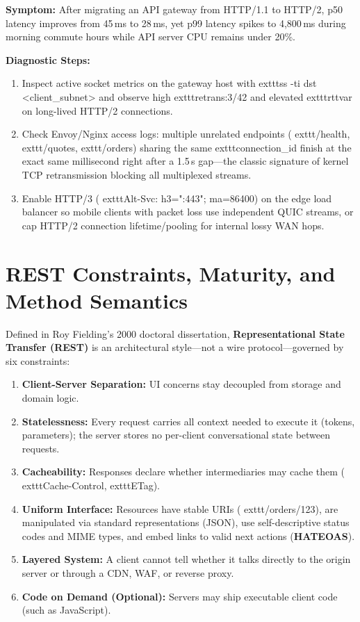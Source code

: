 \begin{realworldbox}
\textbf{Symptom:} After migrating an API gateway from HTTP/1.1 to HTTP/2, p50 latency improves from 45\,ms to 28\,ms, yet p99 latency spikes to 4,800\,ms during morning commute hours while API server CPU remains under 20\%.

\textbf{Diagnostic Steps:}
\begin{enumerate}[leftmargin=15pt,itemsep=2pt]
  \item Inspect active socket metrics on the gateway host with 	exttt{ss -ti dst <client\_subnet>} and observe high 	exttt{retrans:3/42} and elevated 	exttt{rttvar} on long-lived HTTP/2 connections.
  \item Check Envoy/Nginx access logs: multiple unrelated endpoints (	exttt{/health}, 	exttt{/quotes}, 	exttt{/orders}) sharing the same 	exttt{connection\_id} finish at the exact same millisecond right after a 1.5\,s gap---the classic signature of kernel TCP retransmission blocking all multiplexed streams.
  \item Enable HTTP/3 (	exttt{Alt-Svc: h3=":443"; ma=86400}) on the edge load balancer so mobile clients with packet loss use independent QUIC streams, or cap HTTP/2 connection lifetime/pooling for internal lossy WAN hops.
\end{enumerate}
\end{realworldbox}

\section{REST Constraints, Maturity, and Method Semantics}

Defined in Roy Fielding's 2000 doctoral dissertation, \textbf{Representational State Transfer (REST)} is an architectural style---not a wire protocol---governed by six constraints:
\begin{enumerate}[leftmargin=15pt]
  \item \textbf{Client-Server Separation:} UI concerns stay decoupled from storage and domain logic.
  \item \textbf{Statelessness:} Every request carries all context needed to execute it (tokens, parameters); the server stores no per-client conversational state between requests.
  \item \textbf{Cacheability:} Responses declare whether intermediaries may cache them (	exttt{Cache-Control}, 	exttt{ETag}).
  \item \textbf{Uniform Interface:} Resources have stable URIs (	exttt{/orders/123}), are manipulated via standard representations (JSON), use self-descriptive status codes and MIME types, and embed links to valid next actions (\textbf{HATEOAS}).
  \item \textbf{Layered System:} A client cannot tell whether it talks directly to the origin server or through a CDN, WAF, or reverse proxy.
  \item \textbf{Code on Demand (Optional):} Servers may ship executable client code (such as JavaScript).
\end{enumerate}

